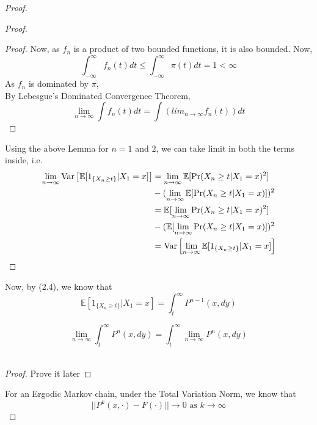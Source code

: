 \begin{theorem}
\begin{proof}
\begin{lem}
\begin{proof}
\begin{lem}
\begin{proof}
                        Now, as $f_n$ is a product of two bounded functions, it is also bounded.
                        Now,
                        $$\int_{-\infty}^{\infty} f_n(t)dt \leq \int_{-\infty}^{\infty} \pi(t)dt = 1 < \infty$$
                        As $f_n$ is dominated by $\pi$, \\
                        By Lebesgue's Dominated Convergence Theorem,
                        $$\lim_{n \rightarrow \infty} \int f_n(t) dt = \int (lim_{n \rightarrow \infty} f_n(t)) dt$$
                    \end{proof}
                \end{lem}
                Using the above Lemma for $n = 1$ and $2$, we can take limit in both the terms inside, i.e.
                \begin{align*}
                    \lim_{n \rightarrow \infty} \text{Var}\left[{{\mathbb{E}[1_{\{X_{n} \geq t\}}|X_1=x]}}\right] &= \lim_{n \rightarrow \infty} \mathbb{E}[\Pr(X_{n} \geq t | X_{1} = x)^2]\\
                    &- (\lim_{n \rightarrow \infty} \mathbb{E}[\Pr(X_{n} \geq t | X_{1} = x)])^2\\
                    &= \mathbb{E}[\lim_{n \rightarrow \infty} \Pr(X_{n} \geq t | X_{1} = x)^2]\\
                    &- (\mathbb{E}[\lim_{n \rightarrow \infty}\Pr(X_{n} \geq t | X_{1} = x)])^2\\
                    &= \text{Var}\left[{{\lim_{n \rightarrow \infty} \mathbb{E}[1_{\{X_{n} \geq t\}}|X_1=x]}}\right]
                \end{align*}
            \end{proof}
        \end{lem}
        Now, by (2.4), we know that
        \begin{equation*}
            \mathbb{E}[1_{\{X_{n} \geq t\}}|X_1=x] = \int_t^{\infty} P^{n-1}(x, dy)
        \end{equation*}
        \begin{lem}
            $$\lim_{n \rightarrow \infty} \int_t^{\infty} P^{n}(x, dy) = \int_t^{\infty} \lim_{n \rightarrow \infty} P^{n}(x, dy)$$\
            \begin{proof}
                Prove it later
            \end{proof}
        \end{lem}
        For an Ergodic Markov chain, under the Total Variation Norm, we know that
        \begin{equation*}
            ||P^k(x, \cdot) - F(\cdot)|| \rightarrow 0 \text{ as } k \rightarrow \infty

\end{equation*}
\end{proof}
\end{theorem}
